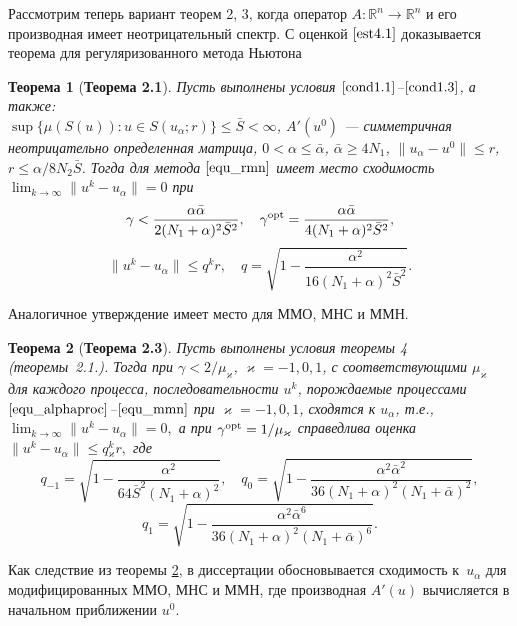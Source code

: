 \documentclass[%
autoref,     %
href,        %
colorlinks,  %
]{disser}
\newtheorem{theorem}{Теорема}
\begin{document}
Рассмотрим теперь вариант теорем 2, 3, когда оператор $A\colon \mathbb{R}^n \to \mathbb{R}^n$ и его производная имеет неотрицательный спектр. С оценкой $\eqref{est4.1}$ доказывается теорема для регуляризованного метода Ньютона
\begin{theorem}[\textbf{Теорема 2.1}]\label{conv_rate_nemonot_nwt}
	Пусть выполнены условия $\eqref{cond1.1}$--$\eqref{cond1.3}$, а также: \\$\sup\{\mu(S(u)): u\in S(u_\alpha;r)\}\leqslant\bar S <\infty$, 
	$A'(u^0)$ --- симметричная неотрицательно определенная матрица, $0<\alpha\leqslant\bar\alpha$, $\bar\alpha\geqslant 4N_1$, $\|u_\alpha-u^0\|\leqslant r$, $r\leqslant\alpha/8N_2\bar S$. Тогда для метода $\eqref{equ_rmn}$ имеет место сходимость $\lim_{k\to\infty}\|u^k-u_\alpha\|=0$ при
	$$\gamma<\frac{\alpha\bar\alpha}{2(N_1+\alpha)^2\bar S^2},
	\quad
	{\gamma}^{\textnormal{opt}}=\frac{\alpha\bar\alpha}{4(N_1+\alpha)^2\bar S^2},$$ 
	$$\|u^k-u_\alpha\|\leqslant q^k r, \quad q=\sqrt{1-\frac{\alpha ^2}{16(N_1+\alpha)^2\bar S^2}}.$$
\end{theorem}
Аналогичное утверждение имеет место для ММО, МНС и ММН.
\begin{theorem}[\textbf{Теорема 2.3}]\label{conv_rate_nemonot_alpha}
Пусть выполнены условия теоремы 4 (теоремы~2.1.). 
Тогда при $\gamma<2/\mu _\varkappa$, $\varkappa=-1,0,1$, с соответствующими $\mu _\varkappa$ для каждого процесса, последовательности ${u^k}$, порождаемые процессами $\eqref{equ_alphaproc}$--$\eqref{equ_mmn}$ при $\varkappa=-1,0,1$, сходятся к $u_\alpha$, т.е., $\lim_{k\to\infty}\|u^k-u_\alpha\|=0,$ а при $
\gamma^{\textnormal{opt}}=1/\mu_\varkappa$
справедлива оценка $\|u^k-u_\alpha\|\leqslant q{_\varkappa^k}r,$ где
$$q_{-1}=\sqrt{1-\frac{\alpha^2}{64\bar S^2(N_1+\alpha)^2}}, \quad q_0=\sqrt{1-\frac{\alpha^2\bar\alpha^2}{36(N_1+\alpha)^2(N_1+\bar\alpha)^2}},$$
$$q_1=\sqrt{1-\frac{\alpha^2\bar\alpha^6}{36(N_1+\alpha)^2(N_1+\bar\alpha)^6}}.$$
\end{theorem}
Как следствие из теоремы \ref{conv_rate_nemonot_alpha}, в диссертации обосновывается сходимость к~$u_\alpha$ для модифицированных ММО, МНС и ММН, где производная $A'(u)$ вычисляется в начальном приближении $u^0$.	
\end{document}
